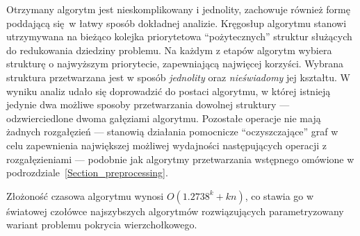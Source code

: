 \par {
  Otrzymany algorytm jest nieskomplikowany i jednolity, zachowuje również formę poddającą się w łatwy sposób dokładnej analizie.
  Kręgosłup algorytmu stanowi utrzymywana na bieżąco kolejka priorytetowa ``pożytecznych'' struktur służących do redukowania dziedziny problemu.
  Na każdym z etapów algorytm wybiera strukturę o najwyższym priorytecie, zapewniającą najwięcej korzyści.
  Wybrana struktura przetwarzana jest w sposób \emph{jednolity} oraz \emph{nieświadomy} jej kształtu.
  W wyniku analiz udało się doprowadzić do postaci algorytmu, w której istnieją jedynie dwa możliwe sposoby przetwarzania dowolnej struktury --- odzwierciedlone dwoma gałęziami algorytmu.
  Pozostałe operacje nie mają żadnych rozgałęzień --- stanowią działania pomocnicze ``oczyszczające'' graf w celu zapewnienia największej możliwej wydajności następujących operacji z rozgałęzieniami --- podobnie jak algorytmy przetwarzania wstępnego omówione w podrozdziale~\ref{Section_preprocessing}.

  Złożoność czasowa algorytmu wynosi $O(1.2738^k + kn)$, co stawia go w światowej czołówce najszybszych algorytmów rozwiązujących parametryzowany wariant problemu pokrycia wierzchołkowego.
}
